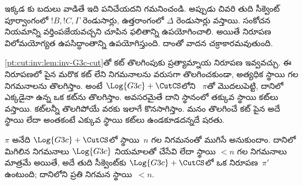 \documentclass[../../../include/open-logic-section]{subfiles}
\begin{document}
ఇక్కడ \CutCS{}కు బదులు \Cut{} వాడితే ఇది పనిచేయదని గమనించండి. అప్పుడు చివరి  తుది సీక్వెంట్ పూర్వాంగంలో $!B, !C, \Gamma$ రెండుసార్లు, ఉత్తరాంగంలో $\Delta$ రెండుసార్లు వస్తాయి. సంకోచన నియమాన్ని వర్తింపజేయవచ్చని చూపిన ఫలితాన్ని ఉపయోగించాలి. అయితే  నిరూపణ విలోమయోగ్యత ఉపసిద్ధాంతాన్ని ఉపయోగిస్తుంది. దాంతో వాదన చక్రాకారమవుతుంది.

\cref{pt:cut:inv:lem:inv-G3c-cut}తో కట్ తొలగింపుకు ప్రత్యామ్నాయ నిరూపణ ఇవ్వవచ్చు. ఈ నిరూపణలో పైన మరొక కట్ లేని \CutCS{} నిగమనాలను వరుసగా తొలగించకుండా, అత్యధిక స్థాయి గల \CutCS{} నిగమనాలను తొలగిస్తాం. అంటే $\Log{G3c} + \CutCS$లోని ~$\pi$తో మొదలుపెట్టి, దానిలో ఎక్కడైనా ఉన్న ఒక కట్‌ను తొలగిస్తాం. అవసరమైతే దాని స్థానంలో తక్కువ స్థాయి కట్‌లు వస్తాయి. కట్‌లన్నీ తొలగిపోయే వరకు ఇలాగే కొనసాగిస్తాం. మనం తొలగించే కట్ పైన అదే స్థాయి లేదా అంతకంటే ఎక్కువ స్థాయి కట్‌లు ఉండకూడదన్నదే షరతు.

\begin{lem} $\pi$ అనేది $\Log{G3c}+\CutCS$లో స్థాయి~$n$ గల \CutCS{} నిగమనంతో ముగిసే  అనుకుందాం. దానిలో మిగిలిన నిగమనాలు $\Log{G3c}$ నియమాలతో చేసేవి లేదా స్థాయి $<n$ గల \CutCS{} నిగమనాలు మాత్రమే అయితే, అదే తుది సీక్వెంట్‌కు $\Log{G3c} + \CutCS$లో ఒక నిరూపణ~$\pi'$ ఉంటుంది; దానిలోని ప్రతి \CutCS{} నిగమన స్థాయి~$<n$.
\end{lem}
\end{document}
